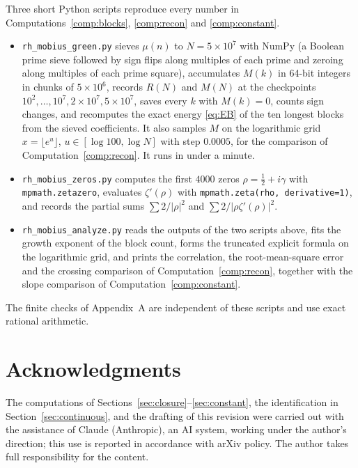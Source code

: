 \documentclass[11pt]{article}
\theoremstyle{definition}
\theoremstyle{remark}
\begin{document}
Three short Python scripts reproduce every number in Computations~\ref{comp:blocks}, \ref{comp:recon} and \ref{comp:constant}.
\begin{itemize}
\item \texttt{rh\_mobius\_green.py} sieves $\mu(n)$ to $N=5\times10^7$ with NumPy (a Boolean prime sieve followed by sign flips along multiples of each prime and zeroing along multiples of each prime square), accumulates $M(k)$ in 64-bit integers in chunks of $5\times10^6$, records $R(N)$ and $M(N)$ at the checkpoints $10^2,\dots,10^7,2\times10^7,5\times10^7$, saves every $k$ with $M(k)=0$, counts sign changes, and recomputes the exact energy \eqref{eq:EB} of the ten longest blocks from the sieved coefficients. It also samples $M$ on the logarithmic grid $x=\lfloor e^{u}\rfloor$, $u\in[\log100,\log N]$ with step $0.0005$, for the comparison of Computation~\ref{comp:recon}. It runs in under a minute.
\item \texttt{rh\_mobius\_zeros.py} computes the first $4000$ zeros $\rho=\tfrac12+i\gamma$ with \texttt{mpmath.zetazero}, evaluates $\zeta'(\rho)$ with \texttt{mpmath.zeta(rho, derivative=1)}, and records the partial sums $\sum2/|\rho|^2$ and $\sum2/|\rho\zeta'(\rho)|^2$.
\item \texttt{rh\_mobius\_analyze.py} reads the outputs of the two scripts above, fits the growth exponent of the block count, forms the truncated explicit formula on the logarithmic grid, and prints the correlation, the root-mean-square error and the crossing comparison of Computation~\ref{comp:recon}, together with the slope comparison of Computation~\ref{comp:constant}.
\end{itemize}
The finite checks of Appendix~A are independent of these scripts and use exact rational arithmetic.

\section*{Acknowledgments}
The computations of Sections~\ref{sec:closure}--\ref{sec:constant}, the identification in Section~\ref{sec:continuous}, and the drafting of this revision were carried out with the assistance of Claude (Anthropic), an AI system, working under the author's direction; this use is reported in accordance with arXiv policy. The author takes full responsibility for the content.
\end{document}
